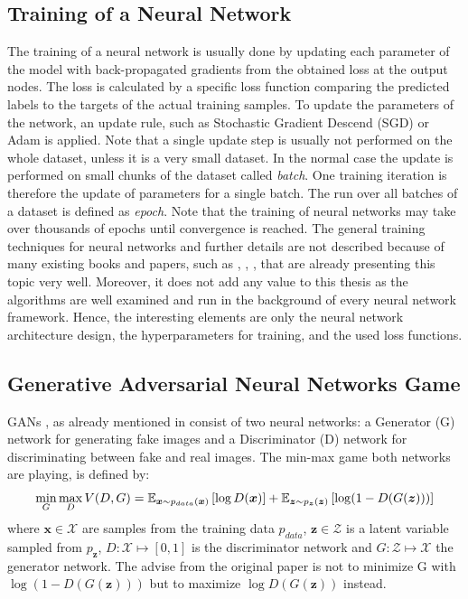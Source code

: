 
\subsection{Training of a Neural Network}
The training of a neural network is usually done by updating each parameter of the model with back-propagated gradients from the obtained loss at the output nodes.
The loss is calculated by a specific loss function comparing the predicted labels to the targets of the actual training samples.
To update the parameters of the network, an update rule, such as Stochastic Gradient Descend (SGD) or Adam \cite{Kingma2015} is applied.
Note that a single update step is usually not performed on the whole dataset, unless it is a very small dataset. 
In the normal case the update is performed on small chunks of the dataset called \emph{batch}.
One training iteration is therefore the update of parameters for a single batch.
The run over all batches of a dataset is defined as \emph{epoch}.
Note that the training of neural networks may take over thousands of epochs until convergence is reached.
The general training techniques for neural networks and further details are not described because of many existing books and papers, such as \cite{LeCun2006}, \cite{Goodfellow2016}, \cite{DeepLearning}, that are already presenting this topic very well. 
Moreover, it does not add any value to this thesis as the algorithms are well examined and run in the background of every neural network framework.
Hence, the interesting elements are only the neural network architecture design, the hyperparameters for training, and the used loss functions.



\subsection{Generative Adversarial Neural Networks Game}\label{sec:nn_theory_gan}
GANs \cite{Goodfellow2014}, as already mentioned in  consist of two neural networks: a Generator (G) network for generating fake images and a Discriminator (D) network for discriminating between fake and real images.
The min-max game both networks are playing, is defined by:
\begin{equation}\label{eq:nn_theory_gan}
  \underset{G}{\min} \, \underset{D}{\max} \, V(D, G) = \mathbb{E}_{\bm{x} \sim p_{data}(\bm{x})}\left[ \log D(\bm{x}) \right] + 
    \mathbb{E}_{\bm{z} \sim p_{\bm{z}}(\bm{z})}\left[ \log (1 - D(G(\bm{z}))) \right]
\end{equation}
where $\bm{x} \in \mathcal{X}$ are samples from the training data $p_{data}$, $\bm{z} \in \mathcal{Z}$ is a latent variable sampled from $p_{\bm{z}}$, $D: \mathcal{X} \mapsto [0, 1]$ is the discriminator network and $G: \mathcal{Z} \mapsto \mathcal{X}$ the generator network.
The advise from the original paper is not to minimize G with $\log (1 - D(G(\bm{z})))$ but to maximize $\log D(G(\bm{z}))$ instead.